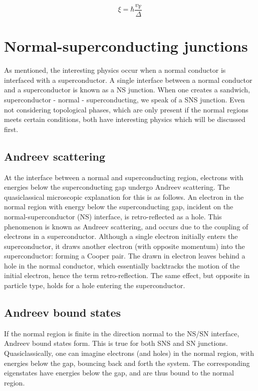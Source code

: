 		\begin{equation}
			\xi = \hbar \frac{v_\text{F}}{\Delta}
			\label{eq:theory_sc_coherence_length}
		\end{equation}

\section{Normal-superconducting junctions}
	As mentioned, the interesting physics occur when a normal conductor is interfaced with a superconductor.
	A single interface between a normal conductor and a superconductor is known as a NS junction.
	When one creates a sandwich, superconductor - normal - superconducting, we speak of a SNS junction.
	Even not considering topological phases, which are only present if the normal regions meets certain conditions, both have interesting physics which will be discussed first.


	\subsection{Andreev scattering}
		At the interface between a normal and superconducting region, electrons with energies below the superconducting gap undergo Andreev scattering.
		The quasiclassical microscopic explanation for this is as follows.
		An electron in the normal region with energy below the superconducting gap, incident on the normal-superconductor (NS) interface, is retro-reflected as a hole.
		This phenomenon is known as Andreev scattering, and occurs due to the coupling of electrons in a superconductor.
		Although a single electron initially enters the superconductor, it draws another electron (with opposite momentum) into the superconductor: forming a Cooper pair.
		The drawn in electron leaves behind a hole in the normal conductor, which essentially backtracks the motion of the initial electron, hence the term retro-reflection.
		The same effect, but opposite in particle type, holds for a hole entering the superconductor.

	\subsection{Andreev bound states}
		If the normal region is finite in the direction normal to the NS/SN interface, Andreev bound states form.
		This is true for both SNS and SN junctions.
		Quasiclassically, one can imagine electrons (and holes) in the normal region, with energies below the gap, bouncing back and forth the system.
		The corresponding eigenstates have energies below the gap, and are thus bound to the normal region.

